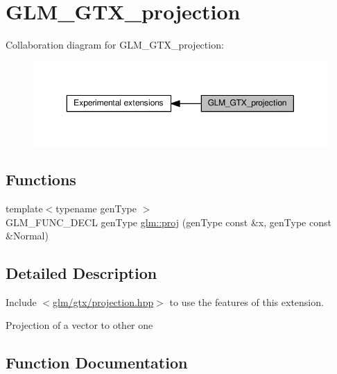 \hypertarget{group__gtx__projection}{}\section{G\+L\+M\+\_\+\+G\+T\+X\+\_\+projection}
\label{group__gtx__projection}
Collaboration diagram for G\+L\+M\+\_\+\+G\+T\+X\+\_\+projection\+:
\nopagebreak
\begin{figure}[H]
\begin{center}
\leavevmode
\includegraphics[width=350pt]{de/dec/group__gtx__projection}
\end{center}
\end{figure}
\subsection*{Functions}
\begin{DoxyCompactItemize}
\item 
{\footnotesize template$<$typename gen\+Type $>$ }\\G\+L\+M\+\_\+\+F\+U\+N\+C\+\_\+\+D\+E\+CL gen\+Type \hyperlink{group__gtx__projection_ga58384b7170801dd513de46f87c7fb00e}{glm\+::proj} (gen\+Type const \&x, gen\+Type const \&Normal)
\end{DoxyCompactItemize}


\subsection{Detailed Description}
Include $<$\hyperlink{projection_8hpp}{glm/gtx/projection.\+hpp}$>$ to use the features of this extension.

Projection of a vector to other one 

\subsection{Function Documentation}
\mbox{\label{group__gtx__projection_ga58384b7170801dd513de46f87c7fb00e}} 
